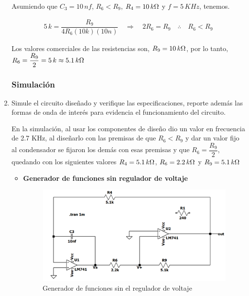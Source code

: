 \begin{enumerate}
                Asumiendo que $C_3=10\, nf$, $R_6<R_9$, $R_4=10\, k\ohm $ y $f=5 \, KHz$, tenemos.

                \begin{gather}
                    5\, k = \dfrac{R_9}{4R_6(10k)(10n)} \quad \Rightarrow \quad 2R_6=R_9 \quad \therefore \quad R_6<R_9 \label{eqn:relacion_r_parte3}
                \end{gather}    

                Los valores comerciales de las resistencias son, $R_9=10\, k \ohm$, por lo tanto, $R_6=\dfrac{R_9}{2}=5\, k \approx 5.1 \, k \ohm$

            \subsubsection{Simulación}
            
            \item Simule el circuito diseñado y verifique las especificaciones, reporte además las formas de onda de interés para evidencia el funcionamiento del circuito.
                
                
                En la simulación, al usar los componentes de diseño dio un valor en frecuencia de 2.7 KHz, al diseñarlo con las premisas de que $R_6<R_9$ y dar un valor fijo al condensador se fijaron los demás con esas premisas y que $R_6=\dfrac{R_9}{2}$, quedando con los siguientes valores $R_4=5.1 \, k \ohm$, $R_6=2.2 \, k \ohm$ y $R_9=5.1\, k \ohm$

                \begin{itemize}
                    \item \textbf{Generador de funciones sin regulador de voltaje}
                
                        \begin{figure}[H]
                            \centering
                            \setcounter{figure}{18}
                            \includegraphics[width=10cm]{Circuitos/sim_gf_sindiodos.png}
                            \caption{Generador de funciones sin el regulador de voltaje}
                            \label{fig:gf_sindiodos}
                        \end{figure}
        

\end{itemize}
\end{enumerate}
